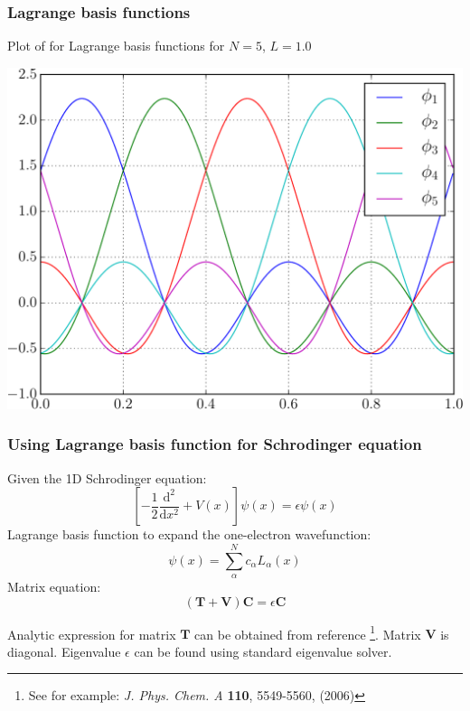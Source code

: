 \documentclass[10pt]{beamer}
\begin{document}
\begin{frame}
\frametitle{Lagrange basis functions}

Plot of for Lagrange basis functions for $N = 5$, $L = 1.0$

{\centering
\includegraphics[scale=0.5]{images/plot_LF_p_N_5.pdf}
\par}

\end{frame}


\begin{frame}
\frametitle{Using Lagrange basis function for Schrodinger equation}

Given the 1D Schrodinger equation:
\begin{equation*}
\left[ -\frac{1}{2}\frac{\mathrm{d}^2}{\mathrm{d}x^2} + V(x)\right ] \psi(x)
= \epsilon \psi(x)
\end{equation*}
Lagrange basis function to expand the one-electron wavefunction:
\begin{equation*}
\psi(x) = \sum_{\alpha}^{N} c_{\alpha} L_{\alpha}(x)
\end{equation*}
Matrix equation:
\begin{equation*}
\left( \mathbf{T} + \mathbf{V} \right) \mathbf{C} = \epsilon \mathbf{C}
\end{equation*}

Analytic expression for matrix $\mathbf{T}$ can be obtained from reference
\footnote{See for example: \textit{J. Phys. Chem. A}
\textbf{110}, {5549-5560}, (2006)}.
Matrix $\mathbf{V}$ is diagonal.
Eigenvalue $\epsilon$ can be found using standard eigenvalue solver.

\end{frame}
\end{document}
